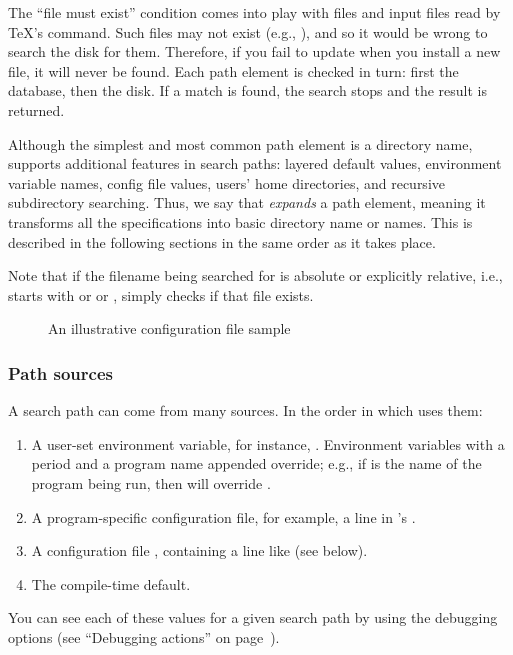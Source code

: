 \documentclass{article}
\begin{document}
The ``file must exist'' condition comes into play with  files and
input files read by \TeX's  command.  Such files may not
exist (e.g., ), and so it would be wrong to search the
disk for them.  Therefore, if you fail to update  when you
install a new  file, it will never be found.
Each path element is checked in turn: first the database, then the
disk.  If a match is found, the search stops and the result is
returned.

Although the simplest and most common path element is a directory
name, \KPS{} supports additional features in search paths: layered
default values, environment variable names, config file values, users'
home directories, and recursive subdirectory searching.  Thus, we say
that \KPS{} \emph{expands} a path element, meaning it transforms all
the specifications into basic directory name or names.  This is
described in the following sections in the same order as it takes
place.

Note that if the filename being searched for is absolute or explicitly
relative, i.e., starts with \samp{/} or  or ,
\KPS{} simply checks if that file exists.

\ifSingleColumn
\else
\begin{figure*}

\setlength{\abovecaptionskip}{0pt}
  \caption{An illustrative configuration file sample}
  \label{fig:config-sample}
\end{figure*}
\fi

\subsubsection{Path sources}
\label{sec:path-sources}

A search path can come from many sources.  In the order in which
\KPS{} uses them:

\begin{enumerate}
\item
  A user-set environment variable, for instance, \@.
  Environment variables with a period and a program name appended
  override; e.g., if  is the name of the program being run,
  then  will override .
\item
  A program-specific configuration file, for exam\-ple, a line
   in 's .
\item   A \KPS{} configuration file , containing a line like
   (see below).
\item The compile-time default.
\end{enumerate}
\noindent You can see each of these values for a given search path by
using the debugging options (see ``Debugging actions'' on
page~\pageref{sec:debugging}).
\end{document}
